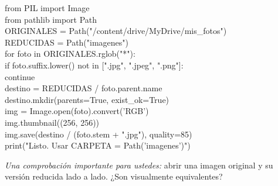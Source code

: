 \documentclass[11pt,a4paper]{article}
\begin{document}
\begin{tcolorbox}[colback=black!3,colframe=black!45,boxrule=0.6pt,fontupper=\ttfamily\small]
from PIL import Image\\
from pathlib import Path\\[4pt]
ORIGINALES = Path("/content/drive/MyDrive/mis\_fotos")\\
REDUCIDAS  = Path("imagenes")\\[4pt]
for foto in ORIGINALES.rglob("*"):\\
\hspace*{1em}if foto.suffix.lower() not in [".jpg", ".jpeg", ".png"]:\\
\hspace*{2em}continue\\
\hspace*{1em}destino = REDUCIDAS / foto.parent.name\\
\hspace*{1em}destino.mkdir(parents=True, exist\_ok=True)\\
\hspace*{1em}img = Image.open(foto).convert('RGB')\\
\hspace*{1em}img.thumbnail((256, 256))\\
\hspace*{1em}img.save(destino / (foto.stem + ".jpg"), quality=85)\\[4pt]
print("Listo. Usar CARPETA = Path('imagenes')")
\end{tcolorbox}

\vspace{4pt}
\noindent\emph{Una comprobación importante para ustedes:} abrir una imagen original y su versión reducida lado a lado. ¿Son visualmente equivalentes?
\end{document}
